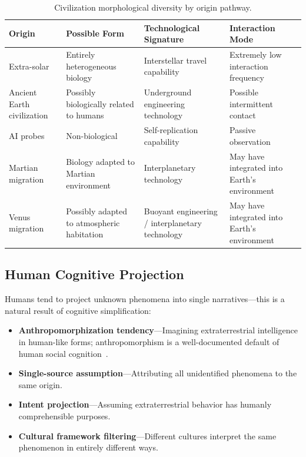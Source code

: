 \documentclass[aps,prd,twocolumn,superscriptaddress,nofootinbib]{revtex4-2}
\begin{document}
\begin{table}[htbp]
\caption{Civilization morphological diversity by origin pathway.}
\label{tab:morphological}
\footnotesize
\begin{tabular}{P{0.161\textwidth}P{0.233\textwidth}P{0.239\textwidth}P{0.240\textwidth}}
\toprule
Origin & Possible Form & Technological Signature & Interaction Mode \\
\midrule
Extra-solar & Entirely heterogeneous biology & Interstellar travel capability & Extremely low interaction frequency \\
Ancient Earth civilization & Possibly biologically related to humans & Underground engineering technology & Possible intermittent contact \\
AI probes & Non-biological & Self-replication capability & Passive observation \\
Martian migration & Biology adapted to Martian environment & Interplanetary technology & May have integrated into Earth's environment \\
Venus migration & Possibly adapted to atmospheric habitation & Buoyant engineering / interplanetary technology & May have integrated into Earth's environment \\
\bottomrule
\end{tabular}
\end{table}

\subsection{Human Cognitive Projection}\label{sec:cognitive-projection}

Humans tend to project unknown phenomena into single narratives---this is a natural result of cognitive simplification:

\begin{itemize}
  \item \textbf{Anthropomorphization tendency}---Imagining extraterrestrial intelligence in human-like forms; anthropomorphism is a well-documented default of human social cognition~\cite{Epley2007}.
  \item \textbf{Single-source assumption}---Attributing all unidentified phenomena to the same origin.
  \item \textbf{Intent projection}---Assuming extraterrestrial behavior has humanly comprehensible purposes.
  \item \textbf{Cultural framework filtering}---Different cultures interpret the same phenomenon in entirely different ways.
\end{itemize}
\end{document}
